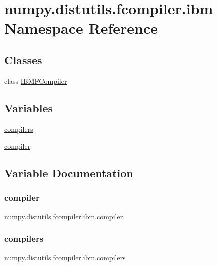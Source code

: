\hypertarget{namespacenumpy_1_1distutils_1_1fcompiler_1_1ibm}{}\section{numpy.\+distutils.\+fcompiler.\+ibm Namespace Reference}
\label{namespacenumpy_1_1distutils_1_1fcompiler_1_1ibm}
\subsection*{Classes}
\begin{DoxyCompactItemize}
\item 
class \hyperlink{classnumpy_1_1distutils_1_1fcompiler_1_1ibm_1_1IBMFCompiler}{I\+B\+M\+F\+Compiler}
\end{DoxyCompactItemize}
\subsection*{Variables}
\begin{DoxyCompactItemize}
\item 
\hyperlink{namespacenumpy_1_1distutils_1_1fcompiler_1_1ibm_a21a46902f0ed00a52c0a2412ff610be6}{compilers}
\item 
\hyperlink{namespacenumpy_1_1distutils_1_1fcompiler_1_1ibm_a49b1a4158d9b228ae4150f66bb6f679e}{compiler}
\end{DoxyCompactItemize}


\subsection{Variable Documentation}
\mbox{\label{namespacenumpy_1_1distutils_1_1fcompiler_1_1ibm_a49b1a4158d9b228ae4150f66bb6f679e}} 
\subsubsection{\texorpdfstring{compiler}{compiler}}
{\footnotesize\ttfamily numpy.\+distutils.\+fcompiler.\+ibm.\+compiler}

\mbox{\label{namespacenumpy_1_1distutils_1_1fcompiler_1_1ibm_a21a46902f0ed00a52c0a2412ff610be6}} 
\subsubsection{\texorpdfstring{compilers}{compilers}}
{\footnotesize\ttfamily numpy.\+distutils.\+fcompiler.\+ibm.\+compilers}


